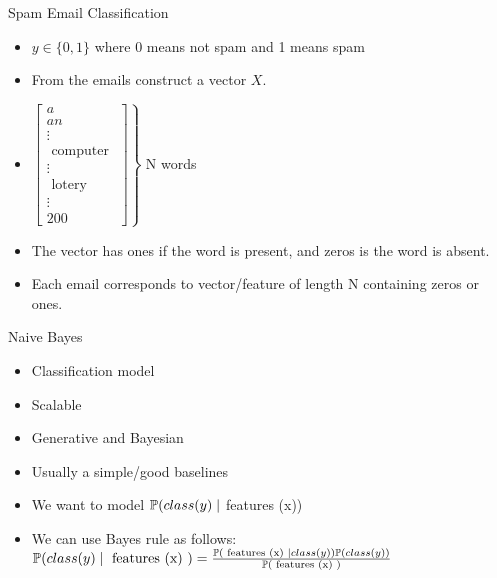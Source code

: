 \documentclass{beamer}
\begin{document}
\begin{frame}{Spam Email Classification}
    \begin{itemize}[<+->]
        \item $y \in\{0,1\}$ where 0 means not spam and 1 means spam
        \item From the emails construct a vector $X$.
        \item $\left. \left[\begin{array}{c}a \\ a n \\ \vdots \\ \text { computer } \\ \vdots \\ \text { lotery } \\ \vdots \\ 200\end{array}\right]\right\}$ N words
        \item The vector has ones if the word is present, and zeros is the word is absent.
        \item Each email corresponds to vector/feature of length N containing zeros or ones.
    \end{itemize}
     
\end{frame}

\begin{frame}{Naive Bayes}
    \begin{itemize}[<+->]
        \item Classification model
        \item Scalable
        \item Generative and Bayesian
        \item Usually a simple/good baselines
        \item  We want to model $\mathbb{P}(class (y) \mid$ features (x)) 
        \item We can use Bayes rule as follows:
        $\mathbb{P}(class(y) \mid \text { features (x) })=\frac{\mathbb{P}(\text { features (x) } \mid class(y)) \mathbb{P}(class(y))}{\mathbb{P}(\text { features (x) })}$
    \end{itemize}
    
   

\end{frame}
\end{document}

